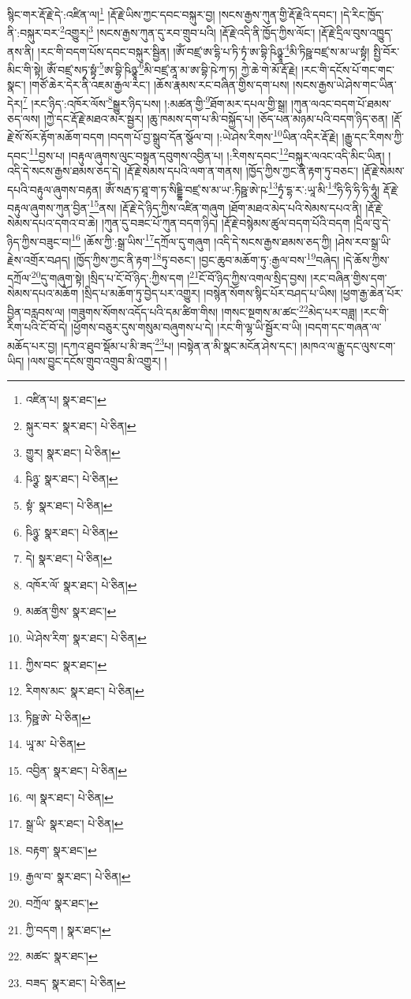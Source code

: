 སྙིང་གར་རྡོ་རྗེ་དེ་:འཛིན་ལ།\footnote{འཛིན་པ།  སྣར་ཐང་། } །རྡོ་རྗེ་ཡིས་ཀྱང་དབང་བསྐུར་བྱ། །སངས་རྒྱས་ཀུན་གྱི་རྡོ་རྗེའི་དབང་། །དེ་རིང་ཁྱོད་ནི་:བསྐུར་བར་\footnote{སྐུར་བར་  སྣར་ཐང་།  པེ་ཅིན། }འགྱུར།\footnote{གྱུར།  སྣར་ཐང་།  པེ་ཅིན། } །སངས་རྒྱས་ཀུན་དུ་རབ་གྲུབ་པའི། །རྡོ་རྗེ་འདི་ནི་ཁྱོད་ཀྱིས་ལོང་། །རྡོ་རྗེ་དྲིལ་བུས་འཁྱུད་ནས་ནི། །རང་གི་བདག་པོས་དབང་བསྐུར་སྦྱིན། །ཨོཾ་བཛྲ་ཨ་དྷི་པ་ཏི་ཏྭཾ་ཨ་བྷི་ཥིཉྩཱ་\footnote{ཥིཉྩ་  སྣར་ཐང་།  པེ་ཅིན། }མི་ཏིཥྛ་བཛྲ་ས་མ་ཡ་སྟྭཾ། སྤྱི་བོར་མིང་གི་སྟེ། ཨོཾ་བཛྲ་སཏྭ་སྟྭཾ་\footnote{སྟཾ་  སྣར་ཐང་།  པེ་ཅིན། }ཨ་བྷི་ཥིཉྩཱ་\footnote{ཥིཉྩ་  སྣར་ཐང་།  པེ་ཅིན། }མི་བཛྲ་ནཱ་མ་ཨ་བྷི་ཥེ་ཀ་ཏ། ཀྱེ་ཆེ་གེ་མོ་རྡོ་རྗེ། །རང་གི་དངོས་པོ་གང་གང་སྣང་། །གཙོ་ཆེར་དེར་ནི་འཇམ་རྒྱལ་རང་། །ཆོས་རྣམས་རང་བཞིན་གྱིས་དག་པས། །སངས་རྒྱས་ཡེ་ཤེས་གང་ཡིན་དེར།\footnote{དེ།  སྣར་ཐང་།  པེ་ཅིན། } །རང་ཉིད་:འཁོར་ལོས་\footnote{འཁོར་ལོ་  སྣར་ཐང་།  པེ་ཅིན། }སྒྱུར་ཉིད་པས། །:མཚན་གྱི་\footnote{མཚན་གྱིས་  སྣར་ཐང་། }ཐོག་མར་དཔལ་གྱི་སྒྲ། །ཀུན་ལའང་བདག་པོ་ཐམས་ཅད་ལས། །ཀྱེ་དང་རྡོ་རྗེ་མཐའ་མར་སྦྱར། །ཆུ་ཁམས་དག་པ་མི་བསྐྱོད་པ། །ཅོད་པན་མཉམ་པའི་བདག་ཉིད་ཅན། །རྡོ་རྗེ་སོ་སོར་རྟོག་མཆོག་བདག །བདག་པོ་བྱ་སྒྲུབ་དོན་སྩོལ་བ། །:ཡེ་ཤེས་རིགས་\footnote{ཡེ་ཤེས་རིག་  སྣར་ཐང་།  པེ་ཅིན། }ཡིན་འདིར་རྡོ་རྗེ། །རྒྱུ་དང་རིགས་ཀྱི་དབང་\footnote{ཀྱིས་བང་  སྣར་ཐང་། }བྱས་པ། །བརྟུལ་ཞུགས་ལུང་བསྟན་དབུགས་འབྱིན་པ། །:རིགས་དབང་\footnote{རིགས་མང་  སྣར་ཐང་།  པེ་ཅིན། }བསྐུར་ལའང་འདི་མིང་ཡིན། །འདི་དེ་སངས་རྒྱས་ཐམས་ཅད་དེ། །རྡོ་རྗེ་སེམས་དཔའི་ལག་ན་གནས། །ཁྱོད་ཀྱིས་ཀྱང་ནི་རྟག་ཏུ་བཅང་། །རྡོ་རྗེ་སེམས་དཔའི་བརྟུལ་ཞུགས་བརྟན། ཨོཾ་སརྦ་ཏ་ཐཱ་ག་ཏ་སིདྡྷི་བཛྲ་ས་མ་ཡ་:ཏིཥྛ་ཨེ་ཥ་\footnote{ཏིཥྛ་ཨེ་  པེ་ཅིན། }ཏྭཾ་དྷ་ར་:ཡཱ་མི་\footnote{ཡཱ་མ་  པེ་ཅིན། }ཧི་ཧི་ཧི་ཧི་ཧཱུཾ། རྡོ་རྗེ་བརྟུལ་ཞུགས་ཀུན་བྱིན་\footnote{འབྱིན་  སྣར་ཐང་།  པེ་ཅིན། }ནས། །རྡོ་རྗེ་དེ་ཉིད་ཀྱིས་འཛིན་གཞུག །ཐོག་མཐའ་མེད་པའི་སེམས་དཔའ་ནི། །རྡོ་རྗེ་སེམས་དཔའ་དགའ་བ་ཆེ། །ཀུན་དུ་བཟང་པོ་ཀུན་བདག་ཉིད། །རྡོ་རྗེ་བསྙེམས་ཚུལ་བདག་པོའི་བདག །དྲིལ་བུ་དེ་ཉིད་ཀྱིས་བཟུང་བ།\footnote{ལ།  སྣར་ཐང་།  པེ་ཅིན། } །ཆོས་ཀྱི་:སྒྲ་ཡིས་\footnote{སྒྲ་ཡི་  སྣར་ཐང་།  པེ་ཅིན། }དཀྲོལ་དུ་གཞུག །འདི་དེ་སངས་རྒྱས་ཐམས་ཅད་ཀྱི། །ཤེས་རབ་སྒྲ་ཡི་རྗེས་འགྲོར་བཤད། །ཁྱོད་ཀྱིས་ཀྱང་ནི་རྟག་\footnote{བརྟག་  སྣར་ཐང་། }ཏུ་བཅང་། །བྱང་ཆུབ་མཆོག་ཏུ་:རྒྱལ་བས་\footnote{རྒྱལ་བ་  སྣར་ཐང་།  པེ་ཅིན། }བཞེད། །དེ་ཆོས་ཀྱིས་དཀྲོལ་\footnote{བཀྲོལ་  སྣར་ཐང་། }དུ་གཞུག་སྟེ། །སྲིད་པ་ངོ་བོ་ཉིད་:ཀྱིས་དག །\footnote{ཀྱི་བདག །  སྣར་ཐང་། }ངོ་བོ་ཉིད་ཀྱིས་འགལ་སྲིད་བྱས། །རང་བཞིན་གྱིས་དག་སེམས་དཔའ་མཆོག །སྲིད་པ་མཆོག་ཏུ་བྱེད་པར་འགྱུར། །བསྙེན་སོགས་སྙིང་པོར་བཤད་པ་ཡིས། །ཕྱག་རྒྱ་ཆེན་པོར་བྱིན་བརླབས་ལ། །གཟུགས་སོགས་འདོད་པའི་དམ་ཚིག་གིས། །གསང་སྔགས་མ་ཚང་\footnote{མཚང་  སྣར་ཐང་། }མེད་པར་བཟླ། །རང་གི་རིག་པའི་ངོ་བོ་དེ། །ཕྱོགས་བཅུར་དུས་གསུམ་བཞུགས་པ་དེ། །རང་གི་ལྷ་ཡི་སྦྱོར་བ་ཡི། །བདག་དང་གཞན་ལ་མཆོད་པར་བྱ། །དཀའ་ཐུབ་སྡོམ་པ་མི་ཟད་\footnote{བཟད་  སྣར་ཐང་།  པེ་ཅིན། }པ། །བསྟེན་ན་མི་སྣང་མངོན་ཤེས་དང་། །མཁའ་ལ་རྒྱུ་དང་ལུས་ངག་ཡིད། །ལས་བྱུང་དངོས་གྲུབ་འགྲུབ་མི་འགྱུར། །
